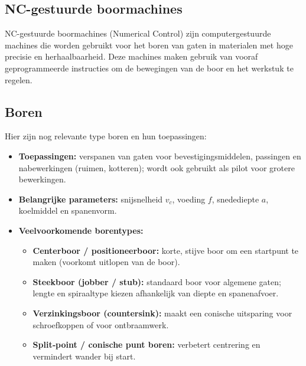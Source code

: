 \documentclass[a4paper,12pt,twoside]{report}
\begin{document}
\subsection{NC-gestuurde boormachines}
NC-gestuurde boormachines (Numerical Control) zijn computergestuurde machines die worden gebruikt voor het boren van gaten in materialen met
hoge precisie en herhaalbaarheid.
Deze machines maken gebruik van vooraf geprogrammeerde instructies
om de bewegingen van de boor en het werkstuk te regelen.
\newline

\subsection{Boren}
Hier zijn nog relevante type boren en hun toepassingen:
\begin{itemize}
	\item \textbf{Toepassingen:} verspanen van gaten voor bevestigingsmiddelen, passingen en nabewerkingen (ruimen, kotteren); wordt ook gebruikt als pilot voor grotere bewerkingen.
	\item \textbf{Belangrijke parameters:} snijsnelheid $v_c$, voeding $f$, snedediepte $a$, koelmiddel en spanenvorm.
	\item \textbf{Veelvoorkomende borentypes:}
	      \begin{itemize}
		      \item \textbf{Centerboor / positioneerboor:} korte, stijve boor om een startpunt te maken (voorkomt uitlopen van de boor).
		      \item \textbf{Steekboor (jobber / stub):} standaard boor voor algemene gaten; lengte en spiraaltype kiezen afhankelijk van diepte en spanenafvoer.
		      \item \textbf{Verzinkingsboor (countersink):} maakt een conische uitsparing voor schroefkoppen of voor ontbraamwerk.
		      \item \textbf{Split‑point / conische punt boren:} verbetert centrering en vermindert wander bij start.
	      \end{itemize}
\end{itemize}
\end{document}
